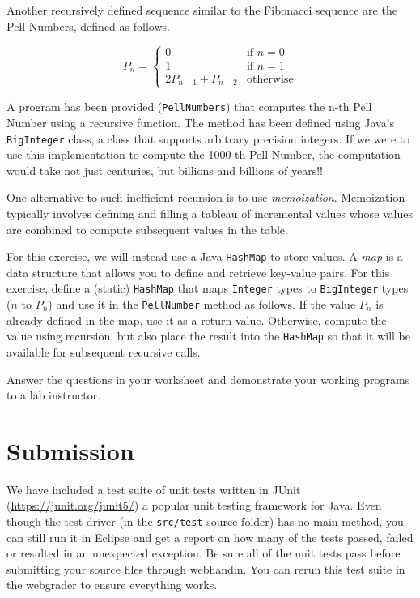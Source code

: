 \documentclass[12pt]{scrartcl}
\begin{document}
Another recursively defined sequence similar to the Fibonacci 
sequence are the Pell Numbers, defined as follows.

$$P_n = \left\{
\begin{array}{ll}
0 & \textrm{if } n=0 \\
1 & \textrm{if } n=1 \\
2P_{n-1}+P_{n-2} & \textrm{otherwise}
\end{array}
\right.$$
 
A program has been provided (\texttt{PellNumbers}) that 
computes the n-th Pell Number using a recursive function.  The method 
has been defined using Java's \texttt{BigInteger} class, 
a class that supports arbitrary precision integers.  If we were to 
use this implementation to compute the 1000-th Pell Number, the 
computation would take not just centuries, but billions and billions 
of years!!

One alternative to such inefficient recursion is to use \emph{memoization}.  
Memoization typically involves defining and filling a tableau of 
incremental values whose values are combined to compute subsequent 
values in the table.  

For this exercise, we will instead use a Java \texttt{HashMap} 
to store values.  A \emph{map} is a data structure that allows you 
to define and retrieve key-value pairs.  For this exercise, define 
a (static) \texttt{HashMap} that maps \texttt{Integer} types to \texttt{BigInteger} types ($n$ to $P_n$) and use 
it in the \texttt{PellNumber} method as follows.  If
the value $P_n$ is already defined in the map, use it as a return 
value.  Otherwise, compute the value using recursion, but also place 
the result into the \texttt{HashMap} so that it will be 
available for subsequent recursive calls.

Answer the questions in your worksheet and demonstrate your working 
programs to a lab instructor.

\section*{Submission}

We have included a test suite of unit tests written in JUnit 
(\url{https://junit.org/junit5/}) a popular unit testing framework for
Java.  Even though the test driver (in the \texttt{src/test}
source folder) has no main method, you can still run it in Eclipse and
get a report on how many of the tests passed, failed or resulted in 
an unexpected exception.  Be sure all of the unit tests pass before
submitting your source files through webhandin.  You can rerun this
test suite in the webgrader to ensure everything works.  
\end{document}
